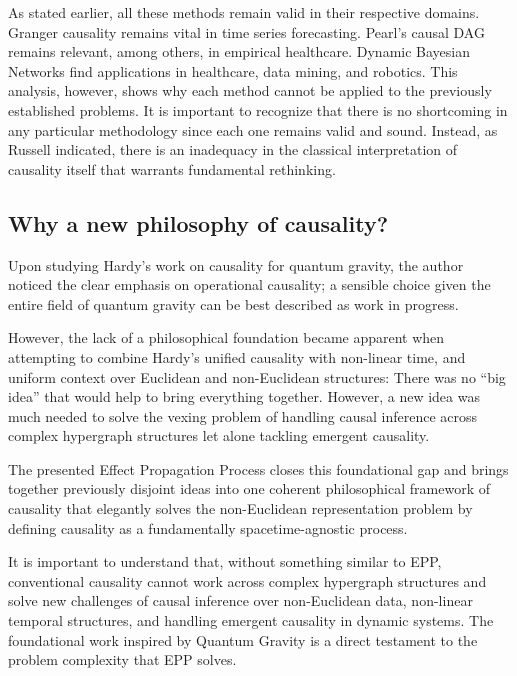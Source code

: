 \documentclass{article}
\begin{document}
As stated earlier, all these methods remain valid in their respective domains. Granger causality remains vital in time series forecasting. Pearl’s causal DAG remains relevant, among others, in empirical healthcare. Dynamic Bayesian Networks find applications in healthcare, data mining, and robotics. This analysis, however, shows why each method cannot be applied to the previously established problems. It is important to recognize that there is no shortcoming in any particular methodology since each one remains valid and sound. Instead, as Russell indicated, there is an inadequacy in the classical interpretation of causality itself that warrants fundamental rethinking.

\subsection{Why a new philosophy of causality?}

Upon studying Hardy’s work on causality for quantum gravity\cite{HardyDynamicCausalStructure}, the author noticed the clear emphasis on operational causality; a sensible choice given the entire field of quantum gravity can be best described as work in progress.

However, the lack of a philosophical foundation became apparent when attempting to combine Hardy’s unified causality with non-linear time, and uniform context over Euclidean and non-Euclidean structures: There was no “big idea” that would help to bring everything together. However, a new idea was much needed to solve the vexing problem of handling causal inference across complex hypergraph structures let alone tackling emergent causality.

The presented Effect Propagation Process closes this foundational gap and brings together previously disjoint ideas into one coherent philosophical framework of causality that elegantly solves the non-Euclidean representation problem by defining causality as a fundamentally spacetime-agnostic process.

It is important to understand that, without something similar to EPP, conventional causality cannot work across complex hypergraph structures and solve new challenges of causal inference over non-Euclidean data, non-linear temporal structures, and handling emergent causality in dynamic systems. The foundational work inspired by Quantum Gravity is a direct testament to the problem complexity that EPP solves.
 
\newpage
\end{document}
